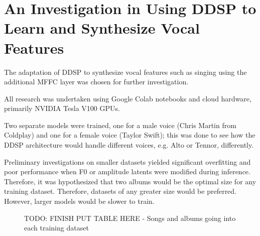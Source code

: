 \chapter{An Investigation in Using DDSP to Learn and Synthesize Vocal Features}

The adaptation of DDSP to synthesize vocal features such as singing using the additional MFFC layer was chosen for further investigation.

All research was undertaken using Google Colab notebooks and cloud hardware, primarily NVIDIA Tesla V100 GPUs.

Two separate models were trained, one for a male voice (Chris Martin from Coldplay) and one for a female voice (Taylor Swift); this was done to see how the DDSP architecture would handle different voices, e.g. Alto or Tennor, differently.

Preliminary investigations on smaller datasets yielded significant overfitting and poor performance when F0 or amplitude latents were modified during inference. Therefore, it was hypothesized that two albums would be the optimal size for any training dataset. Therefore, datasets of any greater size would be preferred. However, larger models would be slower to train.

\begin{figure}[!ht]
    \centering
    \caption{TODO: FINISH PUT TABLE HERE - Songs and albums going into each training dataset}
\end{figure}





